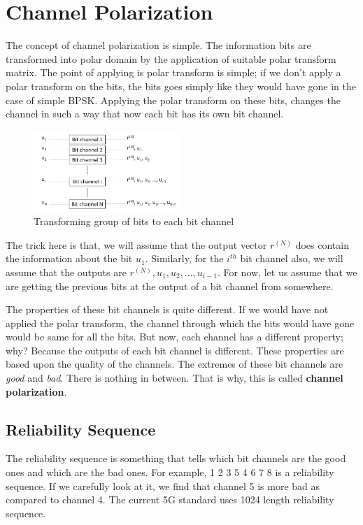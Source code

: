\documentclass[twocolumn]{report}
\begin{document}
\section{Channel Polarization}
The concept of channel polarization is simple. The information bits are transformed into polar domain by the application of suitable polar transform matrix. The point of applying is polar transform is simple; if we don't apply a polar transform on the bits, the bits goes simply like they would have gone in the case of simple BPSK. Applying the polar transform on these bits, changes the channel in such a way that now each bit has its own bit channel.
\begin{figure}[H]
\centering \includegraphics[width=0.5\textwidth, height=0.22\textheight]{bitchannels.png}
\caption{Transforming group of bits to each bit channel}
\end{figure}
The trick here is that, we will assume that the output vector $r^{(N)}$ does contain the information about the bit $u_{1}$. Similarly, for the $i^{th}$ bit channel also, we will assume that the outputs are $r^{(N)}, u_{1}, u_{2}, ..., u_{i-1}$. For now, let us assume that we are getting the previous bits at the output of a bit channel from somewhere. 
\par The properties of these bit channels is quite different. If we would have not applied the polar transform, the channel through which the bits would have gone would be same for all the bits. But now, each channel has a different property; why? Because the outputs of each bit channel is different. These properties are based upon the quality of the channels. The extremes of these bit channels are \textit{good} and \textit{bad}. There is nothing in between. That is why, this is called \textbf{channel polarization}.
\subsection{Reliability Sequence}
The reliability sequence is something that tells which bit channels are the good ones and which are the bad ones. For example, 1 2 3 5 4 6 7 8 is a reliability sequence. If we carefully look at it, we find that channel 5 is more bad as compared to channel 4. The current 5G standard uses 1024 length reliability sequence.
\end{document}
